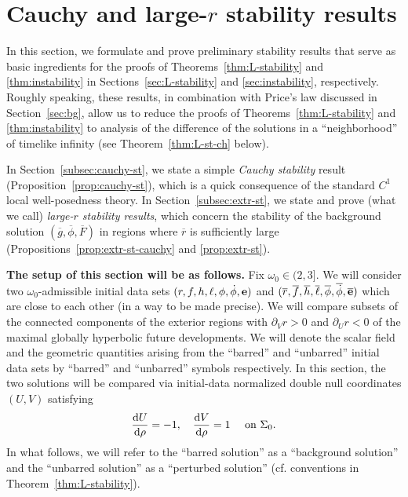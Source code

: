 \documentclass[10pt, reqno]{amsart}
\theoremstyle{definition}
\theoremstyle{remark}
\theoremstyle{conjecture}
\numberwithin{equation}{section}
\newcommand{\ud}{\mathrm{d}}
\newcommand{\rd}{\partial}
\newcommand{\0}{\emptyset}
\newcommand{\Sgm}{\Sigma}
\newcommand{\omg}{\omega}
\newcommand{\bfe}{{\bf e}}
\newcommand{\e}{\bfe}							%
\newcommand{\gbg}{\overline{g}}					%
\newcommand{\Fbg}{\overline{F}}					%
\newcommand{\phibg}{\overline{\phi}}				%
\newcommand{\rbg}{\overline{r}}					%
\newcommand{\ebg}{\overline{\e}}					%
\newcommand{\fbg}{\overline{f}}
\newcommand{\hbg}{\overline{h}}
\newcommand{\ellbg}{\overline{\ell}}
\newcommand{\dphibg}{\overline{\dot{\phi}}}
\begin{document}
\section{Cauchy and large-$r$ stability results} \label{sec:extr}
In this section, we formulate and prove preliminary stability results that serve as basic ingredients for the proofs of Theorems~\ref{thm:L-stability} and \ref{thm:instability} in Sections~\ref{sec:L-stability} and \ref{sec:instability}, respectively. Roughly speaking, these results, in combination with Price's law discussed in Section~\ref{sec:bg}, allow us to reduce the proofs of Theorems~\ref{thm:L-stability} and \ref{thm:instability} to analysis of the difference of the solutions in a ``neighborhood'' of timelike infinity (see Theorem~\ref{thm:L-st-ch} below).

In Section~\ref{subsec:cauchy-st}, we state a simple \emph{Cauchy stability} result (Proposition~\ref{prop:cauchy-st}), which is a quick consequence of the standard $C^{1}$ local well-posedness theory. In Section~\ref{subsec:extr-st}, we state and prove (what we call) \emph{large-$r$ stability results}, which concern the stability of the background solution $(\gbg, \phibg, \Fbg)$ in regions where $\rbg$ is sufficiently large (Propositions~\ref{prop:extr-st-cauchy} and \ref{prop:extr-st}).

\textbf{The setup of this section will be as follows.} Fix $\omg_0 \in (2,3]$. We will consider two $\omg_0$-admissible initial data sets $(r, f, h, \ell, \phi, \dot{\phi}, \e)$ and $(\rbg, \fbg, \hbg, \ellbg, \phibg, \dphibg, \ebg)$ which are close to each other (in a way to be made precise). We will compare subsets of the connected components of the exterior regions with $\rd_V r>0$ and $\rd_U r<0$ of the maximal globally hyperbolic future developments. We will denote the scalar field and the geometric quantities arising from the ``barred'' and ``unbarred'' initial data sets by ``barred'' and ``unbarred'' symbols respectively. In this section, the two solutions will be compared via initial-data normalized double null coordinates $(U,V)$ satisfying
\begin{equation}\label{def.U.V.Cauchy}
	\frac{\ud U}{\ud \rho} = -1, \quad \frac{\ud V}{\ud \rho} = 1 \quad \hbox{ on } \Sgm_{0}.
\end{equation}
In what follows, we will refer to the ``barred solution'' as a ``background solution'' and the ``unbarred solution'' as a ``perturbed solution'' (cf. conventions in Theorem~\ref{thm:L-stability}).
\end{document}

